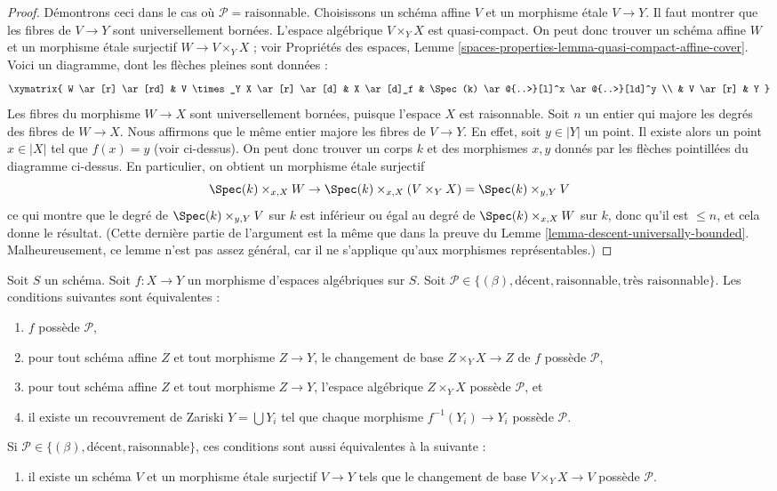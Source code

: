 \begin{proof}
\medskip\noindent
Démontrons ceci dans le cas où $\mathcal{P} = \text{raisonnable}$.
Choisissons un schéma affine $V$ et un morphisme étale $V \to Y$.
Il faut montrer que les fibres de $V \to Y$ sont universellement bornées.
L'espace algébrique $V \times_Y X$ est quasi-compact.
On peut donc trouver un schéma affine $W$ et un morphisme étale surjectif
$W \to V \times_Y X$ ; voir
Propriétés des espaces,
Lemme \ref{spaces-properties-lemma-quasi-compact-affine-cover}.
Voici un diagramme, dont les flèches pleines sont données :
$$
\xymatrix{
W \ar[r]  \ar[rd] &
V \times_Y X \ar[r] \ar[d] &
X \ar[d]_f & \Spec(k) \ar@{..>}[l]^x \ar@{..>}[ld]^y \\
 & V \ar[r] & Y
}
$$
Les fibres du morphisme $W \to X$ sont universellement bornées, puisque
l'espace $X$ est raisonnable. Soit $n$ un entier qui majore les degrés des
fibres de $W \to X$. Nous affirmons que le même entier majore les fibres de
$V \to Y$. En effet, soit $y \in |Y|$ un point. Il existe alors un point
$x \in |X|$ tel que $f(x) = y$ (voir ci-dessus).
On peut donc trouver un corps $k$ et des morphismes $x, y$ donnés par les
flèches pointillées du diagramme ci-dessus. En particulier, on obtient un
morphisme étale surjectif
$$
\Spec(k) \times_{x, X} W
\to
\Spec(k) \times_{x, X} (V \times_Y X) = \Spec(k) \times_{y, Y} V
$$
ce qui montre que le degré de $\Spec(k) \times_{y, Y} V$ sur $k$ est
inférieur ou égal au degré de $\Spec(k) \times_{x, X} W$ sur $k$, donc qu'il
est $\leq n$, et cela donne le résultat. (Cette dernière partie de
l'argument est la même que dans la preuve du
Lemme \ref{lemma-descent-universally-bounded}.
Malheureusement, ce lemme n'est pas assez général, car il ne s'applique
qu'aux morphismes représentables.)
\end{proof}

\begin{lemma}
\label{lemma-relative-conditions-local}
Soit $S$ un schéma.
Soit $f : X \to Y$ un morphisme d'espaces algébriques sur $S$.
Soit $\mathcal{P} \in \{(\beta), \text{décent}, \text{raisonnable}, \text{très raisonnable}\}$.
Les conditions suivantes sont équivalentes :
\begin{enumerate}
\item $f$ possède $\mathcal{P}$,
\item pour tout schéma affine $Z$ et tout morphisme $Z \to Y$, le changement
de base $Z \times_Y X \to Z$ de $f$ possède $\mathcal{P}$,
\item pour tout schéma affine $Z$ et tout morphisme $Z \to Y$, l'espace
algébrique $Z \times_Y X$ possède $\mathcal{P}$, et
\item il existe un recouvrement de Zariski $Y = \bigcup Y_i$ tel que chaque
morphisme $f^{-1}(Y_i) \to Y_i$ possède $\mathcal{P}$.
\end{enumerate}
Si $\mathcal{P} \in \{(\beta), \text{décent}, \text{raisonnable}\}$, ces conditions sont
aussi
équivalentes à la suivante :
\begin{enumerate}
\item[(5)] il existe un schéma $V$ et un morphisme étale surjectif
$V \to Y$ tels que le changement de base $V \times_Y X \to V$ possède
$\mathcal{P}$.
\end{enumerate}
\end{lemma}


